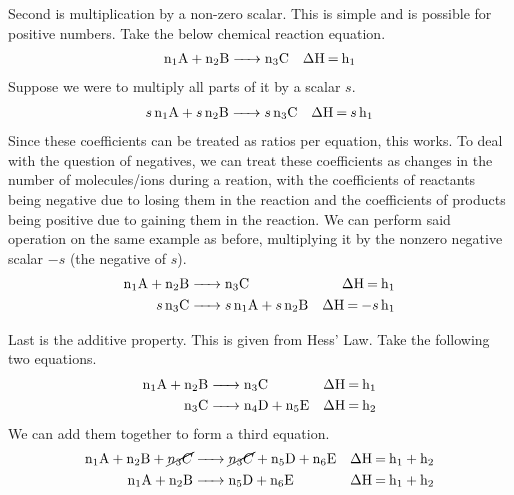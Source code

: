 \documentclass[11pt]{article}
\begin{document}
        Second is multiplication by a non-zero scalar.
        This is simple and is possible for positive numbers.
        Take the below chemical reaction equation.
        \begin{align}
            \ce{n_1A + n_2B} & \ce{-> n_3C} & \ce{\Delta H = h_1}
        \end{align}
        Suppose we were to multiply all parts of it by a scalar $s$.
        \begin{align}
            \ce{s n_1A + s n_2B} & \ce{-> s n_3C} & \ce{\Delta H = s h_1}
        \end{align}
        Since these coefficients can be treated as ratios per equation, this works.
        To deal with the question of negatives, we can treat these coefficients as changes in the number of molecules/ions during a reation, with the coefficients of reactants being negative due to losing them in the reaction and the coefficients of products being positive due to gaining them in the reaction.
        We can perform said operation on the same example as before, multiplying it by the nonzero negative scalar $-s$ (the negative of $s$).
        \begin{align}
            \ce{n_1A + n_2B} & \ce{-> n_3C} & \ce{\Delta H = h_1}\\
            \ce{s n_3C} & \ce{-> s n_1A + s n_2B} & \ce{\Delta H = -s h_1}
        \end{align}

        Last is the additive property.
        This is given from Hess' Law.
        Take the following two equations.
        \begin{align}
            \ce{n_1A + n_2B} & \ce{-> n_3C} & \ce{\Delta H = h_1}\\
            \ce{n_3C} & \ce{-> n_4D + n_5E} & \ce{\Delta H = h_2}
        \end{align}
        We can add them together to form a third equation.
        \begin{align}
            \ce{n_1A + n_2B + \cancel{n_3C}} & \ce{-> \cancel{n_3C} + n_5D + n_6E} & \ce{\Delta H = h_1 + h_2}\\
            \ce{n_1A + n_2B} & \ce{-> n_5D + n_6E} & \ce{\Delta H = h_1 + h_2}
        \end{align}
    
\end{document}
